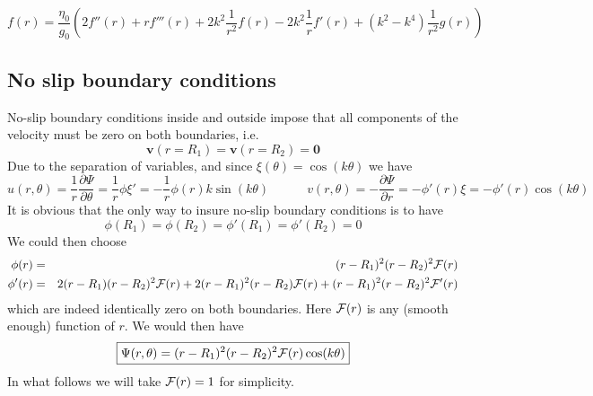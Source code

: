 \[
f(r) = \frac{\eta_0}{g_0} \left( 
2 f''(r)  + r f'''(r)  + 2k^2 \frac{1}{r^2} f(r)
-2k^2 \frac{1}{r} f'(r)  
+ (k^2-k^4) \frac{1}{r^2} g(r) 
\right)
\]






\subsection{No slip boundary conditions}

No-slip boundary conditions inside and outside impose that all components of the velocity
must be zero on both boundaries, i.e.
\[
{\bm v}(r=R_1)={\bm v}(r=R_2)={\bm 0}
\]
Due to the separation of variables, and since  $\xi(\theta)=\cos(k\theta)$ we have
\[
u(r,\theta) = \frac{1}{r}\frac{\partial \Psi}{\partial \theta} 
=\frac{1}{r} \phi \xi' 
=-\frac{1}{r} \phi(r) k \sin(k \theta) 
\quad\quad\quad
v(r,\theta) = - \frac{\partial \Psi}{\partial r} 
= - \phi'(r) \xi 
= - \phi'(r) \cos(k\theta)
\]
It is obvious that the only way to insure no-slip boundary conditions is to have 
\[
\phi(R_1)=\phi(R_2)=\phi'(R_1)=\phi'(R_2)=0
\]
We could then choose
\begin{eqnarray}
\phi(r)&=&(r-R_1)^2(r-R_2)^2 {\cal F}(r) \\
\phi'(r)&=&2(r-R_1)(r-R_2)^2 {\cal F}(r)  +2(r-R_1)^2(r-R_2) {\cal F}(r) +(r-R_1)^2(r-R_2)^2 {\cal F}'(r)
\end{eqnarray}
which are indeed identically zero on both boundaries. Here ${\cal F}(r)$ is any (smooth enough) function of $r$.
We would then have
\[
\boxed{
\Psi(r,\theta) = (r-R_1)^2(r-R_2)^2 {\cal F}(r) \cos(k\theta)
}
\]
In what follows we will take ${\cal F}(r)=1$ for simplicity.


